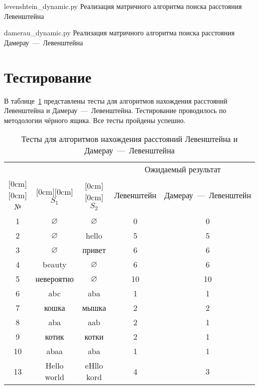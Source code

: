 \clearpage

{levenshtein_dynamic.py}
{Реализация матричного алгоритма поиска расстояния Левенштейна}

{damerau_dynamic.py}
{Реализация матричного алгоритма поиска расстояния Дамерау~---~Левенштейна}

\section{Тестирование}

В таблице~\ref{table:tests} представлены тесты для алгоритмов нахождения расстояний Левенштейна и Дамерау~---~Левенштейна. Тестирование проводилось по методологии чёрного ящика. Все тесты пройдены успешно.

\begin{table}[htb]
\caption{\centering Тесты для алгоритмов нахождения расстояний Левенштейна и Дамерау~---~Левенштейна}
\small
\centering\begin{tabular}{|c|c|c|c|c|}
      \hline
       &  &  & \multicolumn{2}{c|}{Ожидаемый результат} \\
      \cline{4-5}
      \raisebox{1.5ex}[0cm][0cm]{№} & \raisebox{1.5ex}[0cm][0cm]{$S_1$} & \raisebox{1.5ex}[0cm][0cm]{$S_2$} 
      &  Левенштейн & Дамерау~---~Левенштейн \\ \hline
      1 & $\varnothing$ & $\varnothing$ & 0 & 0 \\ \hline
      2 & $\varnothing$ & hello & 5 & 5 \\ \hline
      3 & $\varnothing$ & привет & 6 & 6 \\ \hline
      4 & beauty & $\varnothing$ & 6 & 6 \\ \hline
      5 & невероятно & $\varnothing$ & 10 & 10 \\ \hline
      6 & abc & aba & 1 & 1 \\ \hline
      7 & кошка & мышка & 2 & 2 \\ \hline
      8 & aba & aab & 2 & 1 \\ \hline
      9 & котик & котки & 2 & 1 \\ \hline
      10 & abaa & aba & 1 & 1 \\ \hline
      13 & Hello world & eHllo kord & 4 & 3 \\ \hline
    \end{tabular}
\label{table:tests}
\end{table}
